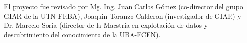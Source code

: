 El proyecto fue revisado por Mg. Ing. Juan Carlos Gómez (co-director del grupo GIAR de la UTN-FRBA), Joaquin Toranzo Calderon (investigador de GIAR) y Dr. Marcelo Soria (director de la Maestría en explotación de datos y descubrimiento del conocimiento de la UBA-FCEN).